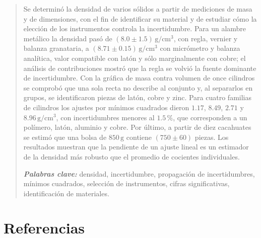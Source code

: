 \documentclass[12pt]{article}
\newcommand{\gcm}{\,\mathrm{g/cm^{3}}}
\newcommand{\g}{\,\mathrm{g}}
\begin{document}
\vspace{0.3 cm}
\justifying
\normalsize

\begin{tcolorbox}[colframe=white, colback=blue!5!white]
\begin{abstract}
Se determinó la densidad de varios sólidos a partir de mediciones de masa y de dimensiones, con el fin de identificar su material y de estudiar cómo la elección de los instrumentos controla la incertidumbre. Para un alambre metálico la densidad pasó de $(8.0 \pm 1.5)\gcm$, con regla, vernier y balanza granataria, a $(8.71 \pm 0.15)\gcm$ con micrómetro y balanza analítica, valor compatible con latón y sólo marginalmente con cobre; el análisis de contribuciones mostró que la regla se volvió la fuente dominante de incertidumbre. Con la gráfica de masa contra volumen de once cilindros se comprobó que una sola recta no describe al conjunto y, al separarlos en grupos, se identificaron piezas de latón, cobre y zinc. Para cuatro familias de cilindros los ajustes por mínimos cuadrados dieron $1.17$, $8.49$, $2.71$ y $8.96\gcm$, con incertidumbres menores al $1.5\,\%$, que corresponden a un polímero, latón, aluminio y cobre. Por último, a partir de diez cacahuates se estimó que una bolsa de $850\g$ contiene $(750 \pm 60)$ piezas. Los resultados muestran que la pendiente de un ajuste lineal es un estimador de la densidad más robusto que el promedio de cocientes individuales.

\vspace{0.8 cm}

\noindent \textit{\textbf{Palabras clave:}} densidad, incertidumbre, propagación de incertidumbres, mínimos cuadrados, selección de instrumentos, cifras significativas, identificación de materiales.
\end{abstract}
\end{tcolorbox}

\begin{multicols}{2}
    
    
\end{multicols}




\section{Referencias}
\printbibliography[heading=none]


\end{document}
